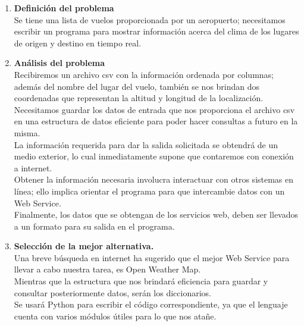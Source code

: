 \documentclass[12pt]{article}
\begin{document}
	\begin{enumerate}
	\item \textbf {Definición del problema}\\
	Se tiene una lista de vuelos proporcionada por un aeropuerto; necesitamos escribir un programa para
	mostrar información acerca del clima de los lugares de origen y destino en tiempo real.
	
	\item \textbf {Análisis del problema}\\
	Recibiremos un archivo csv con la información ordenada por columnas; además del nombre del lugar del vuelo, también se nos brindan dos coordenadas que representan la altitud y longitud de la localización.\\
	Necesitamos guardar los datos de entrada que nos proporciona el archivo csv en una estructura de datos eficiente para poder hacer consultas a futuro en la misma.\\
	La información requerida para dar la salida solicitada se obtendrá de un medio exterior, lo cual inmediatamente
	supone que contaremos con conexión a internet.\\
	Obtener la información necesaria involucra interactuar con otros sistemas en línea; ello implica orientar el programa
	para que intercambie datos con un Web Service.\\
	Finalmente, los datos que se obtengan de los servicios web, deben ser llevados a un formato para su salida en el programa.
	
	\item \textbf {Selección de la mejor alternativa.}\\
	Una breve búsqueda en internet ha sugerido que el mejor Web Service para llevar a cabo nuestra tarea, es Open Weather Map.\\
	Mientras que la estructura que nos brindará eficiencia para guardar y consultar posteriormente datos, serán los diccionarios.\\
	Se usará Python para escribir el código correspondiente, ya que el lenguaje cuenta con varios módulos útiles para lo que nos
	atañe.
	

\end{enumerate}
\end{document}
